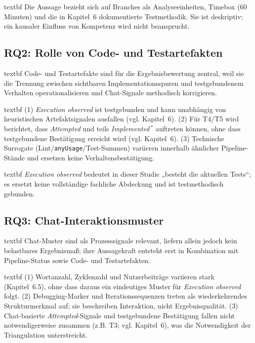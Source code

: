 	\csname textbf Die Aussage bezieht sich auf Branches als Analyseeinheiten, Timebox (60 Minuten) und die in Kapitel~6 dokumentierte Testmethodik. Sie ist deskriptiv; ein kausaler Einfluss von Kompetenz wird nicht beansprucht.

\subsection*{RQ2: Rolle von Code- und Testartefakten}
	\csname textbf Code- und Testartefakte sind für die Ergebnisbewertung zentral, weil sie die Trennung zwischen sichtbaren Implementationsspuren und testgebundenem Verhalten operationalisieren und Chat-Signale methodisch korrigieren.

	\csname textbf (1)  \textit{Execution observed} ist testgebunden und kann unabhängig von heuristischen Artefaktsignalen ausfallen (vgl. Kapitel~6). (2) Für T4/T5 wird berichtet, dass  \textit{Attempted} und teils \textit{Implemented}\,$^\ast$ auftreten können, ohne dass testgebundene Bestätigung erreicht wird (vgl. Kapitel~6). (3) Technische Surrogate (Lint/\texttt{anyUsage}/Test-Summen) variieren innerhalb ähnlicher Pipeline-Stände und ersetzen keine Verhaltensbestätigung.

	\csname textbf \textit{Execution observed} bedeutet in dieser Studie „besteht die aktuellen Tests“; es ersetzt keine vollständige fachliche Abdeckung und ist testmethodisch gebunden.

\subsection*{RQ3: Chat-Interaktionsmuster}
	\csname textbf Chat-Muster sind als Prozesssignale relevant, liefern allein jedoch kein belastbares Ergebnismaß; ihre Aussagekraft entsteht erst in Kombination mit Pipeline-Status sowie Code- und Testartefakten.

	\csname textbf (1) Wortanzahl, Zyklenzahl und Nutzerbeiträge variieren stark (Kapitel~6.5), ohne dass daraus ein eindeutiges Muster für  \textit{Execution observed} folgt. (2) Debugging-Marker und Iterationssequenzen treten als wiederkehrendes Strukturmerkmal auf; sie beschreiben Interaktion, nicht Ergebnisqualität. (3) Chat-basierte \textit{Attempted}-Signale und testgebundene Bestätigung fallen nicht notwendigerweise zusammen (z.B. T3; vgl. Kapitel~6), was die Notwendigkeit der Triangulation unterstreicht.

